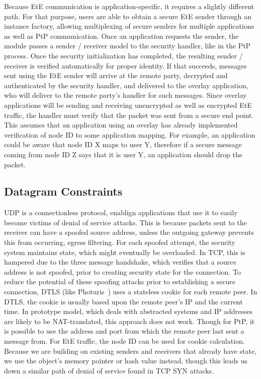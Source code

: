 Because EtE communication is application-specific, it requires a slightly
different path.  For that purpose, users are able to obtain a secure EtE
sender through an instance factory, allowing multiplexing of secure senders for
multiple applications as well as PtP communication.  Once an application
requests the sender, the module passes a sender / receiver model to the
security handler, like in the PtP process.  Once the security initialization
has completed, the resulting sender / receiver is verified automatically for
proper identity.  If that succeeds, messages sent using the EtE sender will
arrive at the remote party, decrypted and authenticated by the security
handler, and delivered to the overlay application, who will deliver to the
remote party's handler for such messages.  Since overlay applications will be
sending and receiving unencrypted as well as encrypted EtE traffic, the handler
must verify that the packet was sent from a secure end point.  This assumes
that an application using an overlay has already implemented verification of
node ID to some application mapping.  For example, an application could be
aware that node ID X maps to user Y, therefore if a secure message coming from
node ID Z says that it is user Y, an application should drop the packet.

\subsection{Datagram Constraints}
UDP is a connectionless protocol, enablign applications that use it to easily
become victims of denial of service attacks.  This is because packets sent to
the receiver can have a spoofed source address, unless the outgoing gateway
prevents this from occurring, egress filtering.  For each spoofed attempt, the
security system maintains state, which might eventually be overloaded.  In TCP,
this is hampered due to the three message handshake, which verifies that a
source address is not spoofed, prior to creating security state for the
connection.  To reduce the potential of these spoofing attacks prior to
establishing a secure connection, DTLS (like Photuris~\cite{photuris}) uses a
stateless cookie for each remote peer.  In DTLS, the cookie is usually based
upon the remote peer's IP and the current time.  In prototype model, which
deals with abstracted systems and IP addresses are likely to be NAT-translated,
this approach does not work.  Though for PtP, it is possible to use the address
and port from which the remote peer last sent a message from.  For EtE traffic,
the node ID can be used for cookie calculation.  Because we are building on
existing senders and receivers that already have state, we use the object's
memory pointer or hash value instead, though this leads us down a similar path
of denial of service found in TCP SYN attacks.

